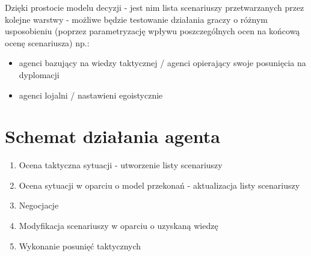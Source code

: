 Dzięki prostocie modelu decyzji - jest nim lista scenariuszy przetwarzanych przez kolejne warstwy - możliwe będzie testowanie działania graczy o różnym usposobieniu (poprzez parametryzację wpływu poszczególnych ocen na końcową ocenę scenariusza) np.:
\begin{itemize}
	\item{agenci bazujący na wiedzy taktycznej / agenci opierający swoje posunięcia na dyplomacji}
	\item{agenci lojalni / nastawieni egoistycznie}
\end{itemize}

\section{Schemat działania agenta}
\begin{enumerate}
	\item{Ocena taktyczna sytuacji - utworzenie listy scenariuszy}
	\item{Ocena sytuacji w oparciu o model przekonań - aktualizacja listy scenariuszy}
	\item{Negocjacje}
	\item{Modyfikacja scenariuszy w oparciu o uzyskaną wiedzę}
	\item{Wykonanie posunięć taktycznych}
\end{enumerate}

